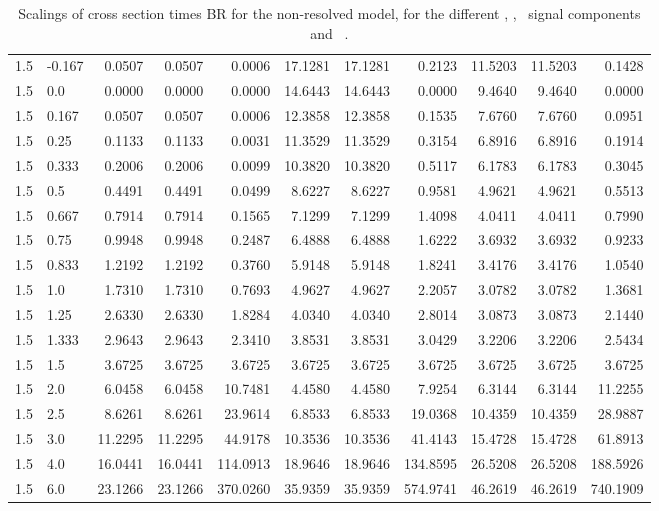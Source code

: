\begin{table}[h!]
\begin{tabular}{ll rrr rrr rrr}
   1.5 & -0.167 & 0.0507  & 0.0507  & 0.0006     & 17.1281 & 17.1281 & 0.2123     & 11.5203 & 11.5203 & 0.1428 \\
   1.5 & 0.0    & 0.0000  & 0.0000  & 0.0000     & 14.6443 & 14.6443 & 0.0000     & 9.4640  & 9.4640  & 0.0000 \\
   1.5 & 0.167  & 0.0507  & 0.0507  & 0.0006     & 12.3858 & 12.3858 & 0.1535     & 7.6760  & 7.6760  & 0.0951 \\
   1.5 & 0.25   & 0.1133  & 0.1133  & 0.0031     & 11.3529 & 11.3529 & 0.3154     & 6.8916  & 6.8916  & 0.1914 \\
   1.5 & 0.333  & 0.2006  & 0.2006  & 0.0099     & 10.3820 & 10.3820 & 0.5117     & 6.1783  & 6.1783  & 0.3045 \\
   1.5 & 0.5    & 0.4491  & 0.4491  & 0.0499     & 8.6227  & 8.6227  & 0.9581     & 4.9621  & 4.9621  & 0.5513 \\
   1.5 & 0.667  & 0.7914  & 0.7914  & 0.1565     & 7.1299  & 7.1299  & 1.4098     & 4.0411  & 4.0411  & 0.7990 \\
   1.5 & 0.75   & 0.9948  & 0.9948  & 0.2487     & 6.4888  & 6.4888  & 1.6222     & 3.6932  & 3.6932  & 0.9233 \\
   1.5 & 0.833  & 1.2192  & 1.2192  & 0.3760     & 5.9148  & 5.9148  & 1.8241     & 3.4176  & 3.4176  & 1.0540 \\
   1.5 & 1.0    & 1.7310  & 1.7310  & 0.7693     & 4.9627  & 4.9627  & 2.2057     & 3.0782  & 3.0782  & 1.3681 \\
   1.5 & 1.25   & 2.6330  & 2.6330  & 1.8284     & 4.0340  & 4.0340  & 2.8014     & 3.0873  & 3.0873  & 2.1440 \\
   1.5 & 1.333  & 2.9643  & 2.9643  & 2.3410     & 3.8531  & 3.8531  & 3.0429     & 3.2206  & 3.2206  & 2.5434 \\
   1.5 & 1.5    & 3.6725  & 3.6725  & 3.6725     & 3.6725  & 3.6725  & 3.6725     & 3.6725  & 3.6725  & 3.6725 \\
   1.5 & 2.0    & 6.0458  & 6.0458  & 10.7481    & 4.4580  & 4.4580  & 7.9254     & 6.3144  & 6.3144  & 11.2255 \\
   1.5 & 2.5    & 8.6261  & 8.6261  & 23.9614    & 6.8533  & 6.8533  & 19.0368    & 10.4359 & 10.4359 & 28.9887 \\
   1.5 & 3.0    & 11.2295 & 11.2295 & 44.9178    & 10.3536 & 10.3536 & 41.4143    & 15.4728 & 15.4728 & 61.8913 \\
   1.5 & 4.0    & 16.0441 & 16.0441 & 114.0913   & 18.9646 & 18.9646 & 134.8595   & 26.5208 & 26.5208 & 188.5926 \\
   1.5 & 6.0    & 23.1266 & 23.1266 & 370.0260   & 35.9359 & 35.9359 & 574.9741   & 46.2619 & 46.2619 & 740.1909 \\\hline
    \end{tabular}                                                                                                                                                                          
    \caption{Scalings of cross section times BR for the non-resolved model, for the different \ttH, \tHq, \tHW\ signal components and \ .}\label{tab:xsbrscalingK6_1p5}                              
 \end{table}   


